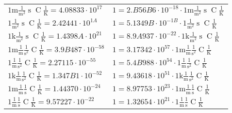 \begin{center}
\begin{longtable}{l l}
{\color{gray}$1 \bm{\mathrm{ m}}\frac1{\operatorname{m}^2}{\operatorname{s}}{\operatorname{C}}\frac1{\operatorname{K}} = 4.08833\cdot10^{17} $}   & {\color{gray}$ 1 = 2.B56B6\cdot10^{-18} \cdot 1 \bm{\mathrm{ m}}\frac1{\operatorname{m}^2}{\operatorname{s}}{\operatorname{C}}\frac1{\operatorname{K}}$}  \\
{\color{black}$1 \bm{\mathrm{ }}\frac1{\operatorname{m}^2}{\operatorname{s}}{\operatorname{C}}\frac1{\operatorname{K}} = 2.42441\cdot10^{1A} $}   & {\color{black}$ 1 = 5.1349B\cdot10^{-1B} \cdot 1 \bm{\mathrm{ }}\frac1{\operatorname{m}^2}{\operatorname{s}}{\operatorname{C}}\frac1{\operatorname{K}}$}  \\
{\color{gray}$1 \bm{\mathrm{ k}}\frac1{\operatorname{m}^2}{\operatorname{s}}{\operatorname{C}}\frac1{\operatorname{K}} = 1.4398A\cdot10^{21} $}   & {\color{gray}$ 1 = 8.9A937\cdot10^{-22} \cdot 1 \bm{\mathrm{ k}}\frac1{\operatorname{m}^2}{\operatorname{s}}{\operatorname{C}}\frac1{\operatorname{K}}$}  \\
{\color{gray}$1 \bm{\mathrm{ m}}\frac1{\operatorname{m}}\frac1{\operatorname{s}^2}{\operatorname{C}}\frac1{\operatorname{K}} = 3.9B487\cdot10^{-58} $}   & {\color{gray}$ 1 = 3.17342\cdot10^{57} \cdot 1 \bm{\mathrm{ m}}\frac1{\operatorname{m}}\frac1{\operatorname{s}^2}{\operatorname{C}}\frac1{\operatorname{K}}$}  \\
{\color{black}$1 \bm{\mathrm{ }}\frac1{\operatorname{m}}\frac1{\operatorname{s}^2}{\operatorname{C}}\frac1{\operatorname{K}} = 2.27115\cdot10^{-55} $}   & {\color{black}$ 1 = 5.4B988\cdot10^{54} \cdot 1 \bm{\mathrm{ }}\frac1{\operatorname{m}}\frac1{\operatorname{s}^2}{\operatorname{C}}\frac1{\operatorname{K}}$}  \\
{\color{gray}$1 \bm{\mathrm{ k}}\frac1{\operatorname{m}}\frac1{\operatorname{s}^2}{\operatorname{C}}\frac1{\operatorname{K}} = 1.347B1\cdot10^{-52} $}   & {\color{gray}$ 1 = 9.43618\cdot10^{51} \cdot 1 \bm{\mathrm{ k}}\frac1{\operatorname{m}}\frac1{\operatorname{s}^2}{\operatorname{C}}\frac1{\operatorname{K}}$}  \\
{\color{gray}$1 \bm{\mathrm{ m}}\frac1{\operatorname{m}}\frac1{\operatorname{s}}{\operatorname{C}}\frac1{\operatorname{K}} = 1.44370\cdot10^{-24} $}   & {\color{gray}$ 1 = 8.97753\cdot10^{23} \cdot 1 \bm{\mathrm{ m}}\frac1{\operatorname{m}}\frac1{\operatorname{s}}{\operatorname{C}}\frac1{\operatorname{K}}$}  \\
{\color{black}$1 \bm{\mathrm{ }}\frac1{\operatorname{m}}\frac1{\operatorname{s}}{\operatorname{C}}\frac1{\operatorname{K}} = 9.57227\cdot10^{-22} $}   & {\color{black}$ 1 = 1.32654\cdot10^{21} \cdot 1 \bm{\mathrm{ }}\frac1{\operatorname{m}}\frac1{\operatorname{s}}{\operatorname{C}}\frac1{\operatorname{K}}$}  \\

\end{longtable}
\end{center}
